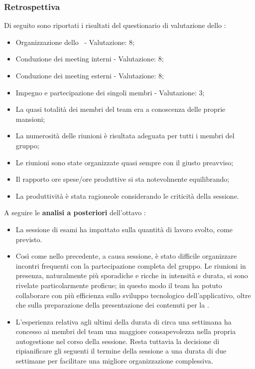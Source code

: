 \subsubsection{Retrospettiva}

\par Di seguito sono riportati i risultati del questionario di valutazione dello :
\begin{itemize}
  \item Organizzazione dello \ - Valutazione: 8;
  \item Conduzione dei meeting interni - Valutazione: 8;
  \item Conduzione dei meeting esterni - Valutazione: 8;
  \item Impegno e partecipazione dei singoli membri - Valutazione: 3;
  \item La quasi totalità dei membri del team era a conoscenza delle proprie mansioni;
  \item La numerosità delle riunioni è risultata adeguata per tutti i membri del gruppo;
  \item Le riunioni sono state organizzate quasi sempre con il giusto preavviso;
  \item Il rapporto ore spese/ore produttive si sta notevolmente equilibrando;
  \item La produttività è stata ragioneole considerando le criticità della sessione.
\end{itemize}

\vspace{0.5\baselineskip}
\par A seguire le \textbf{analisi a posteriori} dell'ottavo :
\begin{itemize}
  \item La sessione di esami ha impattato sulla quantità di lavoro svolto, come previsto.
  \item Così come nello  precedente, a causa sessione, è stato difficile organizzare incontri frequenti con la partecipazione completa del gruppo. Le riunioni in presenza, naturalmente più sporadiche e ricche in intensità e durata, si sono rivelate particolarmente proficue; in questo modo il team ha potuto collaborare con più efficienza sullo sviluppo tecnologico dell'applicativo, oltre che sulla preparazione della presentazione dei contenuti per la \RTB.
  \item L'esperienza relativa agli ultimi  della durata di circa una settimana ha concesso ai membri del team una maggiore consapevolezza nella propria autogestione nel corso della sessione. Resta tuttavia la decisione di ripianificare gli  seguenti il termine della sessione a una durata di due settimane per facilitare una migliore organizzazione complessiva.
\end{itemize}

